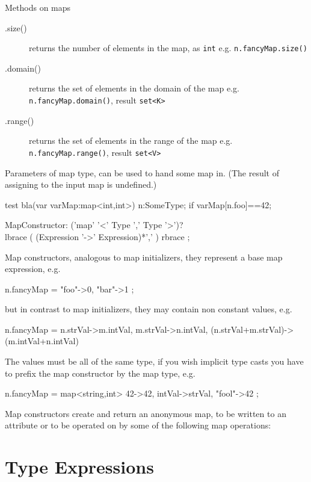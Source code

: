 Methods on maps
\begin{description}
  \item[.size()] returns the number of elements in the map, as \texttt{int}
 e.g. \texttt{n.fancyMap.size()}
  \item[.domain()] returns the set of elements in the domain of the map
 e.g. \texttt{n.fancyMap.domain()}, result \verb#set<K>#
  \item[.range()] returns the set of elements in the range of the map
 e.g. \texttt{n.fancyMap.range()}, result \verb#set<V>#
\end{description}

Parameters of map type, can be used to hand some map in.
(The result of assigning to the input map is undefined.)
\begin{grgen}
test bla(var varMap:map<int,int>) 
{
	n:SomeType;
	if {  varMap[n.foo]==42; }
}
\end{grgen}

\begin{rail}
  MapConstructor: ('map' '<' Type ',' Type '>')? \\ lbrace ( (Expression '->' Expression)*',' ) rbrace ;
\end{rail}

Map constructors, analogous to map initializers, they represent a base map expression, e.g. 
\begin{grgenlet}
n.fancyMap = { "foo"->0, "bar"->1 };
\end{grgenlet}
but in contrast to map initializers, they may contain non constant values, e.g.
\begin{grgenlet}
n.fancyMap = { n.strVal->m.intVal, m.strVal->n.intVal, (n.strVal+m.strVal)->(m.intVal+n.intVal) } 
\end{grgenlet}
The values must be all of the same type, if you wish implicit type casts 
you have to prefix the map constructor by the map type, e.g.
\begin{grgenlet}
n.fancyMap = map<string,int>{ 42->42, intVal->strVal, "fool"->42 };
\end{grgenlet}
Map constructors create and return an anonymous map, to be written to an attribute or to be operated on by some of the following map operations:


\section{Type Expressions}
\label{typeexpressions}

